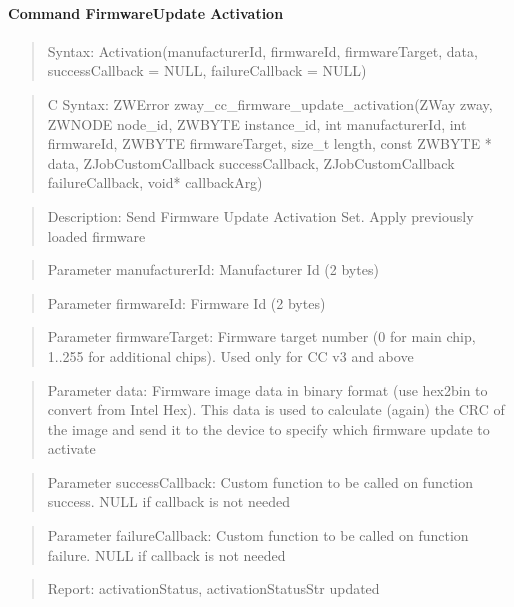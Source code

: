 \paragraph{Command FirmwareUpdate Activation}
\begin{quote}Syntax: Activation(manufacturerId, firmwareId, firmwareTarget, data, successCallback = NULL, failureCallback = NULL)\end{quote}
\begin{quote}C Syntax: ZWError zway\_cc\_firmware\_update\_activation(ZWay zway, ZWNODE node\_id, ZWBYTE instance\_id, int manufacturerId, int firmwareId, ZWBYTE firmwareTarget, size\_t length, const ZWBYTE * data, ZJobCustomCallback successCallback, ZJobCustomCallback failureCallback, void* callbackArg)\end{quote}
\begin{quote}Description: Send Firmware Update Activation Set. Apply previously loaded firmware\end{quote}
\begin{quote}Parameter manufacturerId: Manufacturer Id (2 bytes)\end{quote}
\begin{quote}Parameter firmwareId: Firmware Id (2 bytes)\end{quote}
\begin{quote}Parameter firmwareTarget: Firmware target number (0 for main chip, 1..255 for additional chips). Used only for CC v3 and above\end{quote}
\begin{quote}Parameter data: Firmware image data in binary format (use hex2bin to convert from Intel Hex). This data is used to calculate (again) the CRC of the image and send it to the device to specify which firmware update to activate\end{quote}
\begin{quote}Parameter successCallback: Custom function to be called on function success. NULL if callback is not needed\end{quote}
\begin{quote}Parameter failureCallback: Custom function to be called on function failure. NULL if callback is not needed\end{quote}
\begin{quote}Report: activationStatus, activationStatusStr updated\end{quote}

